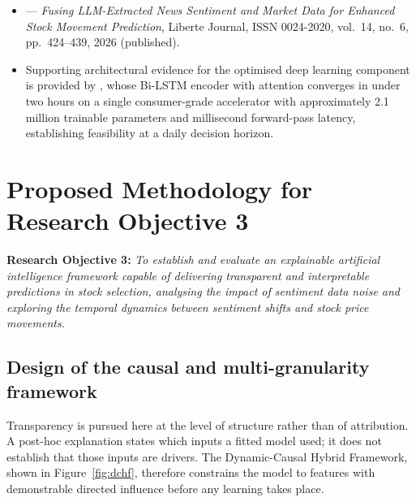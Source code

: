 \begin{itemize}
\item {} --- \emph{Fusing LLM-Extracted News Sentiment and Market Data for
Enhanced Stock Movement Prediction}, Liberte Journal, ISSN 0024-2020, vol.~14, no.~6,
pp.~424--439, 2026 (published).
\item Supporting architectural evidence for the optimised deep learning component is
provided by , whose Bi-LSTM encoder with attention converges in under two
hours on a single consumer-grade accelerator with approximately 2.1 million trainable
parameters and millisecond forward-pass latency, establishing feasibility at a daily
decision horizon.
\end{itemize}

\section{Proposed Methodology for Research Objective 3}

\textbf{Research Objective 3:} \emph{To establish and evaluate an explainable artificial
intelligence framework capable of delivering transparent and interpretable predictions in
stock selection, analysing the impact of sentiment data noise and exploring the temporal
dynamics between sentiment shifts and stock price movements.}

\subsection{Design of the causal and multi-granularity framework}

Transparency is pursued here at the level of structure rather than of attribution. A
post-hoc explanation states which inputs a fitted model used; it does not establish that
those inputs are drivers. The Dynamic-Causal Hybrid Framework, shown in
Figure~\ref{fig:dchf}, therefore constrains the model to features with demonstrable
directed influence before any learning takes place.

